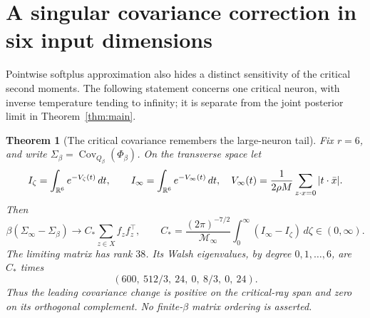 \documentclass[11pt]{article}
\newtheorem{theorem}{Theorem}\newtheorem{lemma}[theorem]{Lemma}
\begin{document}
\section{A singular covariance correction in six input dimensions}
Pointwise softplus approximation also hides a distinct sensitivity of
the critical second moments. The following statement concerns one
critical neuron, with inverse temperature tending to infinity; it is
separate from the joint posterior limit in Theorem~\ref{thm:main}.

\begin{theorem}[The critical covariance remembers the large-neuron tail]
\label{thm:covariance}
Fix $r=6$, and write
$\Sigma_\beta=\operatorname{Cov}_{Q_\beta}(\Phi_\beta)$.
On the transverse space let
\[
 I_\zeta=\int_{\mathbb R^6}e^{-V_\zeta(t)}\,dt,\qquad
 I_\infty=\int_{\mathbb R^6}e^{-V_\infty(t)}\,dt,
 \quad V_\infty(t)=\frac1{2\rho M}\sum_{z\cdot x=0}|t\cdot\bar x|.
\]
Then
\[
 \beta(\Sigma_\infty-\Sigma_\beta)
        \longrightarrow C_*\sum_{z\in X} f_zf_z^\top,
 \qquad
 C_* =\frac{(2\pi)^{-7/2}}{\mathcal M_\infty}
                         \int_0^\infty(I_\infty-I_\zeta)\,d\zeta
                         \in(0,\infty).                \tag{24}
\]
The limiting matrix has rank $38$. Its Walsh eigenvalues, by degree
$0,1,\ldots,6$, are $C_*$ times
\[
                     (600,\ 512/3,\ 24,\ 0,\ 8/3,\ 0,\ 24).
                                                               \tag{25}
\]
Thus the leading covariance change is positive on the critical-ray
span and zero on its orthogonal complement. No finite-$\beta$ matrix
ordering is asserted.
\end{theorem}
\end{document}
